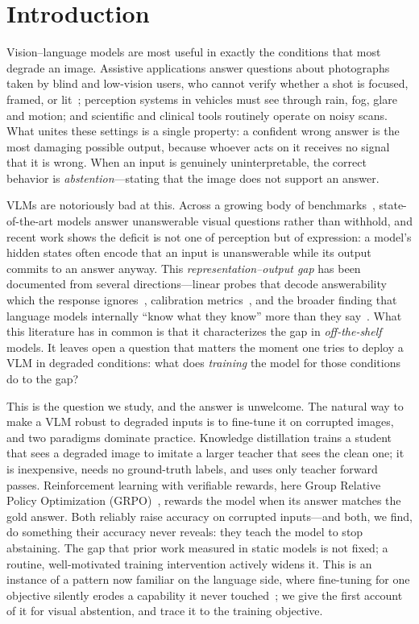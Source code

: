 \documentclass[10pt,twocolumn,letterpaper]{article}
\begin{document}
\section{Introduction}
\label{sec:intro}

Vision--language models are most useful in exactly the conditions that most degrade
an image. Assistive applications answer questions about photographs taken by blind
and low-vision users, who cannot verify whether a shot is focused, framed, or
lit~\cite{gurari2018vizwiz}; perception systems in vehicles must see through rain, fog,
glare and motion; and scientific and clinical tools routinely operate on noisy scans.
What unites these settings is a single property: a confident wrong answer is the most
damaging possible output, because whoever acts on it receives no signal that it is
wrong. When an input is genuinely uninterpretable, the correct behavior is
\emph{abstention}---stating that the image does not support an answer.

VLMs are notoriously bad at this. Across a growing body of
benchmarks~\cite{miyai2024upd,zhu2025mohobench,saadat2025visiontrap,
madhusudhan2026knowing}, state-of-the-art models answer unanswerable visual questions
rather than withhold, and recent work shows the deficit is not one of perception but of
expression: a model's hidden states often encode that an input is unanswerable while its
output commits to an answer anyway. This \emph{representation--output gap} has been
documented from several directions---linear probes that decode answerability which the
response ignores~\cite{he2026knowing,pramono2026trapsbench}, calibration
metrics~\cite{chandu2025certainly}, and the broader finding that language models
internally ``know what they know'' more than they say~\cite{kadavath2022know,
burns2023discovering}. What this literature has in common is that it characterizes the
gap in \emph{off-the-shelf} models. It leaves open a question that matters the moment one
tries to deploy a VLM in degraded conditions: what does \emph{training} the model for
those conditions do to the gap?

This is the question we study, and the answer is unwelcome. The natural way to make a
VLM robust to degraded inputs is to fine-tune it on corrupted images, and two paradigms
dominate practice. Knowledge distillation trains a student that sees a degraded image to
imitate a larger teacher that sees the clean one; it is inexpensive, needs no
ground-truth labels, and uses only teacher forward passes. Reinforcement learning with
verifiable rewards, here Group Relative Policy Optimization
(GRPO)~\cite{shao2024deepseekmath}, rewards the model when its answer matches the gold
answer. Both reliably raise accuracy on corrupted inputs---and both, we find, do
something their accuracy never reveals: they teach the model to stop abstaining. The gap
that prior work measured in static models is not fixed; a routine, well-motivated
training intervention actively widens it. This is an instance of a pattern now
familiar on the language side, where fine-tuning for one objective silently erodes a
capability it never touched~\cite{qi2024finetuning,luo2023empirical}; we give the first
account of it for visual abstention, and trace it to the training objective.
\end{document}
